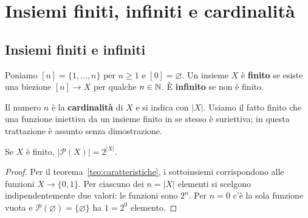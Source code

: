 \chapter{Insiemi finiti, infiniti e cardinalità}

\section{Insiemi finiti e infiniti}
\begin{definizione}
Poniamo $[n]=\{1,\ldots,n\}$ per $n\ge1$ e $[0]=\varnothing$. Un insieme $X$ è \textbf{finito} se esiste una biezione $[n]\to X$ per qualche $n\in\mathbb{N}$. È \textbf{infinito} se non è finito.
\end{definizione}

Il numero $n$ è la \textbf{cardinalità} di $X$ e si indica con $|X|$. Usiamo il fatto finito che una funzione iniettiva da un insieme finito in se stesso è suriettiva; in questa trattazione è assunto senza dimostrazione.

\begin{corollario}
Se $X$ è finito, $|\mathcal P(X)|=2^{|X|}$.
\end{corollario}
\begin{proof}
Per il teorema~\ref{teo:caratteristiche}, i sottoinsiemi corrispondono alle funzioni $X\to\{0,1\}$. Per ciascuno dei $n=|X|$ elementi si scelgono indipendentemente due valori: le funzioni sono $2^n$. Per $n=0$ c'è la sola funzione vuota e $\mathcal P(\varnothing)=\{\varnothing\}$ ha $1=2^0$ elemento.
\end{proof}

